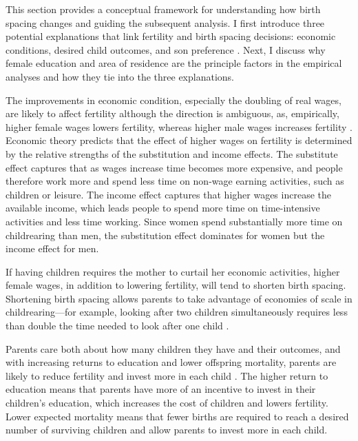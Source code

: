This section provides a conceptual framework for understanding how birth spacing changes
and guiding the subsequent analysis.
I first introduce three potential explanations that link fertility and birth 
spacing decisions: economic conditions, desired child outcomes, and son preference 
\citep{Casterline2016,Portner2018}.
Next, I discuss why female education and area of residence are the principle factors 
in the empirical analyses and how they tie into the three explanations.

The improvements in economic condition, especially the doubling of real wages,
are likely to affect fertility although the direction is ambiguous, as, empirically, 
higher female wages lowers fertility, whereas higher male wages increases fertility 
\citep{Hotz1997,schultz97}.
Economic theory predicts that the effect of higher wages on fertility is determined by 
the relative strengths of the substitution and income effects.
The substitute effect captures that as wages increase time becomes more expensive, and
people therefore work more and spend less time on non-wage earning activities, such as 
children or leisure.
The income effect captures that higher wages increase the available income, which
leads people to spend more time on time-intensive activities and less time working.
Since women spend substantially more time on childrearing than men, the substitution effect 
dominates for women but the income effect for men.

If having children requires the mother to curtail her economic activities, higher
female wages, in addition to lowering fertility, will tend to shorten birth spacing.
Shortening birth spacing allows parents to take advantage of economies of scale in 
childrearing---for example, looking after two children simultaneously requires 
less than double the time needed to look after one child \citep{Vijverberg1982,Hotz1997}.


Parents care both about how many children they have and their outcomes, and with 
increasing returns to education and lower offspring mortality, parents are likely to 
reduce fertility and invest more in each child \citep{Rosenzweig1982a,Wolpin1997}.
The higher return to education means that parents have more of an incentive to 
invest in their children's education, which increases the cost of children and 
lowers fertility. 
Lower expected mortality means that fewer births are required to reach a 
desired number of surviving children and allow parents to invest more in each child.

